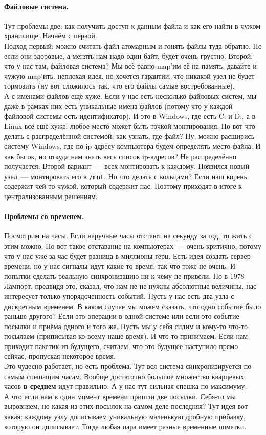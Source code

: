 \documentclass{article}
\begin{document}
    \paragraph{Файловые система.}
    Тут проблемы две: как получить доступ к данным файла и как его найти в чужом хранилище. Начнём с первой.\\
    Подход первый: можно считать файл атомарным и гонять файлы туда-обратно. Но если они здоровые, а менять нам надо один байт, будет очень грустно. Второй: что у нас там, файловая система? Мы всё равно map'им её на память, давайте и чужую map'ить. неплохая идея, но хочется гарантии, что никакой узел не будет тормозить (ну вот сложилось так, что его файлы самые востребованные).\\
    А с именами файлов ещё хуже. Если у нас есть несколько файловых систем, мы даже в рамках них есть уникальные имена файлов (потому что у каждой файловой системы есть идентификатор). И это в Windows, где есть C: и D:, а в Linux всё ещё хуже: любое место может быть точкой монтирования. Но вот что делать с распределённой системой, как узнать, где файл? Ну, можно расширись систему Windows, где по ip-адресу компьютера будем определять место файла. И как бы ок, но откуда нам знать весь список ip-адресов? Не распределённо получается. Второй вариант~--- всех монтировать к каждому. Появился новый узел~--- монтировать его в \texttt{/mnt}. Но что делать с кольцами? Если наш корень содержит чей-то чужой, который содержит нас. Поэтому приходят в итоге к централизованным решениям.
    \paragraph{Проблемы со временем.}
    Посмотрим на часы. Если наручные часы отстают на секунду за год, то жить с этим можно. Но вот такое отставание на компьютерах~--- очень критично, потому что у нас уже за час будет разница в миллионы герц. Есть идея создать сервер времени, но у нас сигналы идут какие-то время, так что тоже не очень. И попытки сделать реальную синхронизацию ни к чему не привели. Но в 1978 Лампорт, предвидя это, сказал, что нам не не нужны абсолютные величины, нас интересует только упорядоченность событий. Пусть у нас есть два узла с дискретным временем. В каком случае мы можем сказать, что одно событие было раньше другого? Если это операции в одной системе или если это событие посылки и приёма одного и того же. Пусть мы у себя сидим и кому-то что-то посылаем (приписывая ко всему наше время). И что-то принимаем. Если нам приходит пакетик из будущего, считаем, что это будущее наступило прямо сейчас, пропуская некоторое время.\\
    Это чудесно работает, но есть проблема. Тут вся система синхронизируется по самым спешащим часам. Вообще достаточно большое множество кварцевых часов \textbf{в среднем} идут правильно. А у нас тут сильная спешка по максимуму.\\
    А что если нам в один момент времени пришли две посылки. Себя-то мы выровняем, но какая из этих посылок на самом деле последняя? Тут идея вот какая: каждому узлу дописываем уникальную маленькую дробную прибавку, которую он дописывает. Тогда любая пара имеет разные временные пометки.
\end{document}
